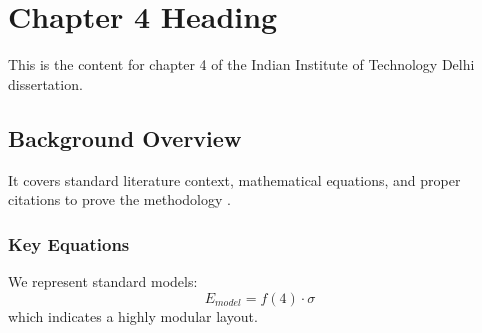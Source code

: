 \chapter{Chapter 4 Heading}
\label{ch:chapter4}
This is the content for chapter 4 of the Indian Institute of Technology Delhi dissertation.

\section{Background Overview}
It covers standard literature context, mathematical equations, and proper citations to prove the methodology \cite{texbook}.

\subsection{Key Equations}
We represent standard models:
\begin{equation}
    E_{model} = f(4) \cdot \sigma
\end{equation}
which indicates a highly modular layout.
